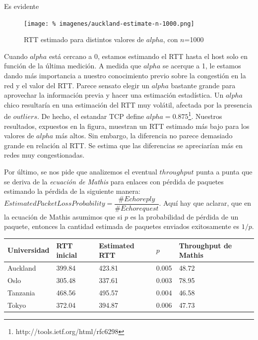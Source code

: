 \documentclass[final,inline,a4paper,narroweqnarray]{ieee}
\begin{document}
Es evidente

\begin{figure}[ht]\begin{center}
   \texttt{[image: \%
    imagenes/auckland-estimate-n-1000.png]}
    \caption{RTT estimado para distintos valores de $alpha$, con $n$=1000}
    \label{fig:auckland-estimate-n-1000}
\end{center}\end{figure}

Cuando $alpha$ está cercano a 0, estamos estimando el RTT hasta el host solo en función de la última medición. A medida que $alpha$ se acerque a 1, le estamos dando más importancia a nuestro conocimiento previo sobre la congestión en la red y el valor del RTT. Parece sensato elegir un $alpha$ bastante grande para aprovechar la información previa y hacer una estimación estadística. Un $alpha$ chico resultaría en una estimación del RTT muy volátil, afectada por la presencia de $outliers$.
De hecho, el estandar TCP define $alpha=0.875$\footnote{http://tools.ietf.org/html/rfc6298}.
Nuestros resultados, expuestos en la figura, muestran un RTT estimado más bajo para los valores de $alpha$ más altos. Sin embargo, la diferencia no parece demasiado grande en relación al RTT. Se estima que las diferencias se apreciarían más en redes muy congestionadas.

Por último, se nos pide que analizemos el eventual $throughput$ punta a punta que se deriva de la
\emph{ecuación de Mathis} para enlaces con pérdida de paquetes estimando la pérdida de la
siguiente manera:
$EstimatedPacketLossProbability = \dfrac{\#Echo reply}{\#Echo request}$. Aquí hay que aclarar,
que en la ecuación de Mathis asumimos que si $p$ es la probabilidad de pérdida de un paquete,
entonces la cantidad estimada de paquetes enviados exitosamente es $1/p$.

\begin{tabular}{| p{1.6cm} | p{1.2cm} | p{1.4cm} | p{1.2cm} | p{1.7cm} |}
  \hline
  Universidad & RTT inicial & Estimated RTT & $p$ & Throughput de Mathis \\
  \hline
  Auckland & 399.84 & 423.81 & 0.005 & 48.72 \\
  Oslo & 305.48 & 337.61 & 0.003 & 78.95 \\
  Tanzania & 468.56 & 495.57 & 0.004 & 46.58 \\
  Tokyo & 372.04 & 394.87 & 0.006 & 47.73 \\
  \hline
\end{tabular}
\end{document}
